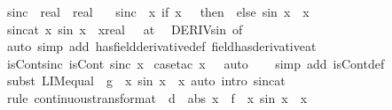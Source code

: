 \documentclass{article}
\theoremstyle{definition}
\begin{document}
\begin{isabellebody}
\isamarkupfalse%
\ sinc\ {\isacharcolon}{\isacharcolon}\ {\isachardoublequoteopen}real\ {\isasymRightarrow}\ real{\isachardoublequoteclose}\ \isanewline
\ \ {\isachardoublequoteopen}sinc\ {\isasymequiv}\ {\isacharparenleft}{\isasymlambda}x{\isachardot}\ if\ x\ {\isacharequal}\ {}\ then\ {}\ else\ sin\ x\ {\isacharslash}\ x{\isacharparenright}{\isachardoublequoteclose}\isanewline
\isanewline
{}\isamarkupfalse%
\ sinc{\isacharunderscore}at{\isacharunderscore}{}{\isacharcolon}\ {\isachardoublequoteopen}{\isacharparenleft}{\isacharparenleft}{\isasymlambda}x{\isachardot}\ sin\ x\ {\isacharslash}\ x{\isacharcolon}{\isacharcolon}real{\isacharparenright}\ {\isacharminus}{\isacharminus}{\isacharminus}{\isachargreater}\ {}{\isacharparenright}\ {\isacharparenleft}at\ {}{\isacharparenright}{\isachardoublequoteclose}\isanewline
{}\isamarkupfalse%
\ DERIV{\isacharunderscore}sin\ {\isacharbrackleft}of\ {}{\isacharbrackright}\ \isamarkupfalse%
\ {\isacharparenleft}auto\ simp\ add{\isacharcolon}\ has{\isacharunderscore}field{\isacharunderscore}derivative{\isacharunderscore}def\ field{\isacharunderscore}has{\isacharunderscore}derivative{\isacharunderscore}at{\isacharparenright}%
\isanewline
{}\isamarkupfalse%
\ isCont{\isacharunderscore}sinc{\isacharcolon}\ {\isachardoublequoteopen}isCont\ sinc\ x{\isachardoublequoteclose}\isanewline
{}\isamarkupfalse%
\ {\isacharparenleft}case{\isacharunderscore}tac\ {\isachardoublequoteopen}x\ {\isacharequal}\ {}{\isachardoublequoteclose}{\isacharcomma}\ auto{\isacharparenright}\isanewline
\ \ \isamarkupfalse%
\ {\isacharparenleft}simp\ add{\isacharcolon}\ isCont{\isacharunderscore}def{\isacharparenright}\isanewline
\ \ \isamarkupfalse%
\ {\isacharparenleft}subst\ LIM{\isacharunderscore}equal\ {\isacharbrackleft}\ g\ {\isacharequal}\ {\isachardoublequoteopen}{\isasymlambda}x{\isachardot}\ sin\ x\ {\isacharslash}\ x{\isachardoublequoteclose}{\isacharbrackright}{\isacharcomma}\ auto\ intro{\isacharcolon}\ sinc{\isacharunderscore}at{\isacharunderscore}{}{\isacharparenright}\isanewline
\ \ \isamarkupfalse%
\ {\isacharparenleft}rule\ continuous{\isacharunderscore}transform{\isacharunderscore}at\ {\isacharbrackleft}\ d\ {\isacharequal}\ {\isachardoublequoteopen}abs\ x{\isachardoublequoteclose}\ \ f\ {\isacharequal}\ {\isachardoublequoteopen}{\isasymlambda}x{\isachardot}\ sin\ x\ {\isacharslash}\ x{\isachardoublequoteclose}{\isacharbrackright}{\isacharparenright}\isanewline

\end{isabellebody}
\end{document}

